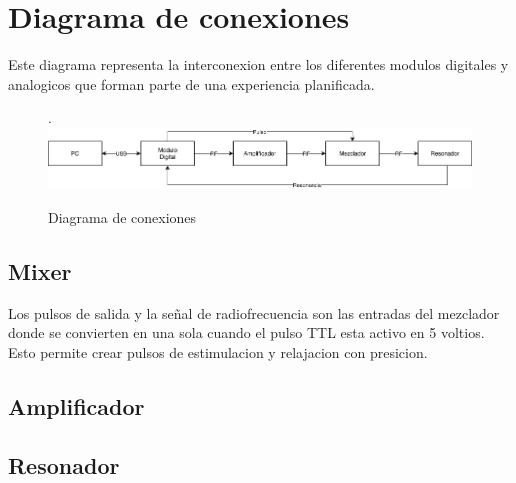\section{Diagrama de conexiones}

Este diagrama representa la interconexion entre los diferentes modulos digitales y analogicos que forman
parte de una experiencia planificada.

\begin{figure}[!htb].
    \includegraphics[width=\linewidth]{../figures/d4.jpg}
    \caption{Diagrama de conexiones}
    \label{fig:d4}
\end{figure}
  

\subsection{Mixer}

Los pulsos de salida y la señal de radiofrecuencia son las entradas del mezclador
donde se convierten en una sola cuando el pulso TTL esta activo en 5 voltios.
Esto permite crear pulsos de estimulacion y relajacion con presicion.

\subsection{Amplificador}


\subsection{Resonador}



\newpage

